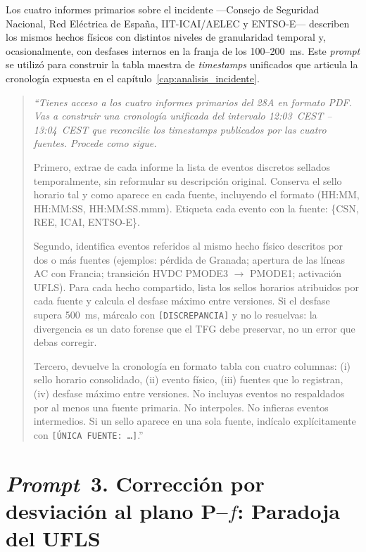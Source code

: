 Los cuatro informes primarios sobre el incidente ---Consejo de Seguridad
Nacional, Red Eléctrica de España, IIT-ICAI/AELEC y ENTSO-E--- describen
los mismos hechos físicos con distintos niveles de granularidad temporal
y, ocasionalmente, con desfases internos en la franja de los 100--200~ms.
Este \textit{prompt} se utilizó para construir la tabla maestra de
\textit{timestamps} unificados que articula la cronología expuesta en el
capítulo~\ref{cap:analisis_incidente}.

\begin{quote}
    \itshape\small
    ``Tienes acceso a los cuatro informes primarios del 28A en formato
    PDF. Vas a construir una cronología unificada del intervalo
    12:03~CEST -- 13:04~CEST que reconcilie los \textit{timestamps}
    publicados por las cuatro fuentes. Procede como sigue.

    \medskip
    Primero, extrae de cada informe la lista de eventos discretos
    sellados temporalmente, sin reformular su descripción original.
    Conserva el sello horario tal y como aparece en cada fuente,
    incluyendo el formato (HH:MM, HH:MM:SS, HH:MM:SS.mmm). Etiqueta
    cada evento con la fuente: \{CSN, REE, ICAI, ENTSO-E\}.

    \medskip
    Segundo, identifica eventos referidos al mismo hecho físico
    descritos por dos o más fuentes (ejemplos: pérdida de Granada;
    apertura de las líneas AC con Francia; transición HVDC PMODE3
    \(\to\) PMODE1; activación UFLS). Para cada hecho compartido, lista
    los sellos horarios atribuidos por cada fuente y calcula el desfase
    máximo entre versiones. Si el desfase supera 500~ms, márcalo con
    \texttt{[DISCREPANCIA]} y no lo resuelvas: la divergencia es un dato
    forense que el TFG debe preservar, no un error que debas corregir.

    \medskip
    Tercero, devuelve la cronología en formato tabla con cuatro
    columnas: (i) sello horario consolidado, (ii) evento físico, (iii)
    fuentes que lo registran, (iv) desfase máximo entre versiones. No
    incluyas eventos no respaldados por al menos una fuente primaria.
    No interpoles. No infieras eventos intermedios. Si un sello aparece
    en una sola fuente, indícalo explícitamente con \texttt{[ÚNICA
    FUENTE: \dots]}.''
\end{quote}

\section*{\textit{Prompt}~3. Corrección por desviación al plano
P--$f$: Paradoja del UFLS}
\label{prompt:ufls}


